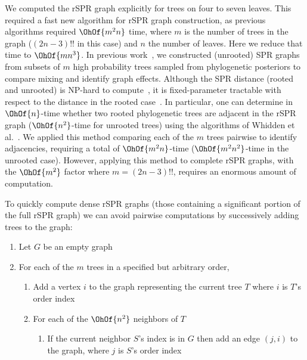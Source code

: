 \documentclass[11pt,onecolumn,conference]{IEEEtran}
\begin{document}
We computed the rSPR graph explicitly for trees on four to seven leaves.
This required a fast new algorithm for rSPR graph construction, as previous algorithms required $\OhOf{m^2 n}$ time, where $m$ is the number of trees in the graph ($(2n-3)!!$ in this case) and $n$ the number of leaves.
Here we reduce that time to $\OhOf{mn^3}$.
In previous work~\cite{Whidden2015-yi}, we constructed (unrooted) SPR graphs from subsets of $m$ high probability trees sampled from phylogenetic posteriors to compare mixing and identify graph effects.
Although the SPR distance (rooted and unrooted) is NP-hard to compute~\cite{bordewich05,hickey2008sdc}, it is fixed-parameter tractable with respect to the distance in the rooted case~\cite{bordewich05}.
In particular, one can determine in $\OhOf{n}$-time whether two rooted phylogenetic trees are adjacent in the rSPR graph ($\OhOf{n^2}$-time for unrooted trees) using the algorithms of Whidden et al.~\cite{whidden2009unifying,whidden2010fast, whidden2013hybridization,Whidden2015-yi}.
We applied this method comparing each of the $m$ trees pairwise to identify adjacencies, requiring a total of $\OhOf{m^2n}$-time ($\OhOf{m^2 n^2}$-time in the unrooted case).
However, applying this method to complete rSPR graphs, with the $\OhOf{m^2}$ factor where $m = (2n-3)!!$, requires an enormous amount of computation.

To quickly compute dense rSPR graphs (those containing a significant portion of the full rSPR graph) we can avoid pairwise computations by successively adding trees to the graph:
\begin{enumerate}[label={\arabic*}.]
	\item Let $G$ be an empty graph
	\item For each of the $m$ trees in a specified but arbitrary order,
		\begin{enumerate}
			\item Add a vertex $i$ to the graph representing the current tree $T$ where $i$ is $T$'s order index
			\item For each of the $\OhOf{n^2}$ neighbors of $T$
				\begin{enumerate}
					\item If the current neighbor $S$'s index is in $G$ then add an edge $(j,i)$ to the graph, where $j$ is $S$'s order index
				\end{enumerate}
		\end{enumerate}
\end{enumerate}
\end{document}
